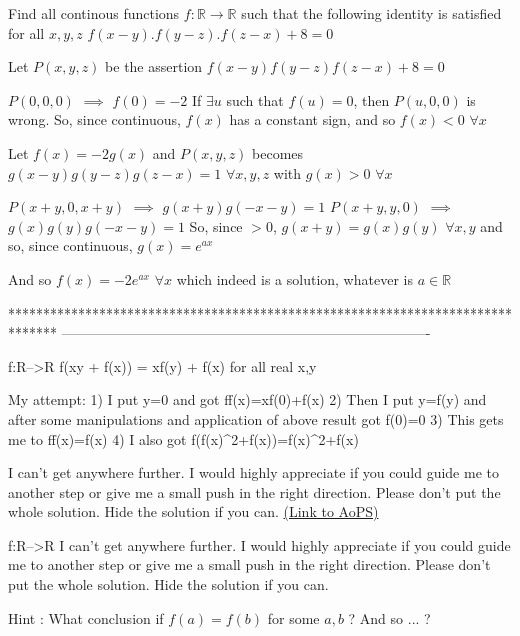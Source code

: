 \begin{solution}
	\begin{tcolorbox}Find all continous functions $f:\mathbb{R}\to\mathbb{R}$ such that the following identity is satisfied for all $x,y,z$ 
$f(x-y).f(y-z).f(z-x)+8=0$\end{tcolorbox}
Let $P(x,y,z)$ be the assertion $f(x-y)f(y-z)f(z-x)+8=0$

$P(0,0,0)$ $\implies$ $f(0)=-2$
If $\exists u$ such that $f(u)=0$, then $P(u,0,0)$ is wrong. So, since continuous, $f(x)$ has a constant sign, and so $f(x)<0$ $\forall x$

Let $f(x)=-2g(x)$ and $P(x,y,z)$ becomes  $g(x-y)g(y-z)g(z-x)=1$ $\forall x,y,z$ with $g(x)>0$ $\forall x$

$P(x+y,0,x+y)$ $\implies$ $g(x+y)g(-x-y)=1$
$P(x+y,y,0)$ $\implies$ $g(x)g(y)g(-x-y)=1$
So, since $>0$, $g(x+y)=g(x)g(y)$ $\forall x,y$ and so, since continuous, $g(x)=e^{ax}$

And so $\boxed{f(x)=-2e^{ax}}$ $\forall x$ which indeed is a solution, whatever is $a\in\mathbb R$
\end{solution}
*******************************************************************************
-------------------------------------------------------------------------------

\begin{problem}
	f:R-->R
f(xy + f(x)) = xf(y) + f(x) for all real x,y

My attempt:
1) I put y=0 and got ff(x)=xf(0)+f(x)
2) Then I put y=f(y) and after some manipulations and application of above result got f(0)=0
3) This gets me to ff(x)=f(x)
4) I also got f(f(x)^2+f(x))=f(x)^2+f(x)

I can't get anywhere further. I would highly appreciate if you could guide me to another step or give me a small push in the right direction. Please don't put the whole solution. Hide the solution if you can.
	\flushright \href{https://artofproblemsolving.com/community/c6h579493}{(Link to AoPS)}
\end{problem}



\begin{solution}
	\begin{tcolorbox}f:R-->R
I can't get anywhere further. I would highly appreciate if you could guide me to another step or give me a small push in the right direction. Please don't put the whole solution. Hide the solution if you can.\end{tcolorbox}
Hint : 
What conclusion if $f(a)=f(b)$ for some $a,b$ ?
And so ... ?
\end{solution}



